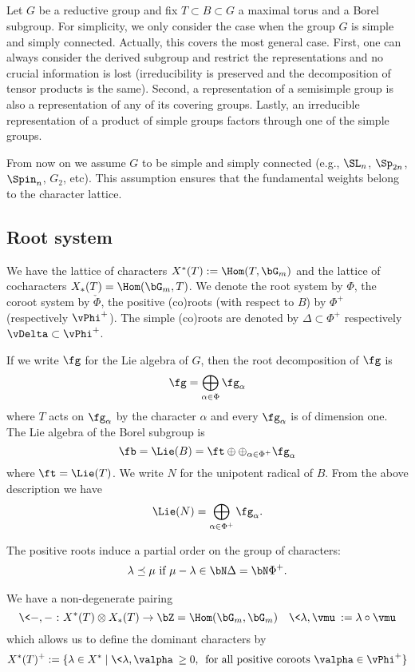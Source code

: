 \documentclass[reqno, 10pt]{amsart}
\theoremstyle{plain}
\theoremstyle{definition}
\numberwithin{equation}{section}%
\begin{document}
\subsection{}\label{ss:conventions}
Let $G$ be a reductive group and fix $T\subset B\subset G$ a maximal torus and a Borel subgroup.
For simplicity, we only consider the case when the group $G$ is simple and simply connected. 
Actually, this covers the most general case. First, one can always consider the derived subgroup and restrict the representations and no crucial information is lost (irreducibility is preserved and the decomposition of tensor products is the same).
Second, a representation of a semisimple group is also a representation of any of its covering groups.
Lastly, an irreducible representation of a product of simple groups factors through one of the simple groups.

From now on we assume $G$ to be simple and simply connected (e.g., $\SL_n$, $\Sp_{2n}$, $\Spin_n$, $G_2$, etc).
This assumption ensures that the fundamental weights belong to the character lattice.

\subsection{Root system}
We have the lattice of characters $X^*(T):=\Hom(T,\bG_m)$ and the lattice of cocharacters $X_*(T) = \Hom(\bG_m,T)$. We denote the root system by $\Phi$, the coroot system by $\check{\Phi}$, the positive (co)roots (with respect to $B$) by $\Phi^+$ (respectively $\vPhi^+$).
The simple (co)roots are denoted by $\Delta\subset \Phi^+$ respectively $\vDelta\subset\vPhi^+$.

If we write $\fg$ for the Lie algebra of $G$, then the root decomposition of $\fg$ is
\[\fg = \bigoplus_{\alpha\in\Phi}\fg_\alpha\]
where $T$ acts on $\fg_\alpha$ by the character $\alpha$ and every $\fg_\alpha$ is of dimension one.
The Lie algebra of the Borel subgroup is
\[\fb=\Lie(B) = \ft\oplus \oplus_{\alpha\in\Phi^+}\fg_\alpha \]
where $\ft=\Lie(T)$.
We write $N$ for the unipotent radical of $B$. From the above description we have
\[\Lie(N) = \bigoplus_{\alpha\in\Phi^+}\fg_\alpha.\]

The positive roots induce a partial order on the group of characters:
\begin{align}\label{E:partial order characters}
\lambda\preceq\mu \text{ if }\mu-\lambda\in\bN\Delta=\bN\Phi^+.	
\end{align} 

We have a non-degenerate pairing
\[\<-,-\>\colon X^*(T)\otimes X_*(T)\to \bZ=\Hom(\bG_m,\bG_m) \quad \<\lambda,\vmu\>:=\lambda\circ\vmu\]
which allows us to define the dominant characters by
\[ X^*(T)^+:=\{\lambda\in X^*\mid \<\lambda,\valpha\>\ge0,\,\text{ for all positive coroots }\valpha\in\vPhi^+ \}\]
\end{document}
